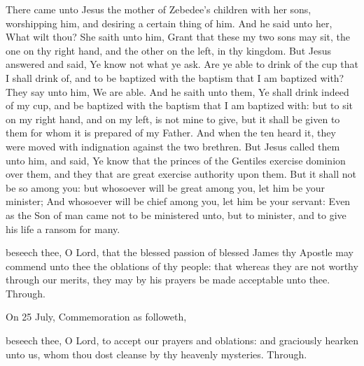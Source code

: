 

 There came unto Jesus the mother of Zebedee's children with her sons, worshipping him, and desiring a certain thing of him. And he said unto her, What wilt thou? She saith unto him, Grant that these my two sons may sit, the one on thy right hand, and the other on the left, in thy kingdom. But Jesus answered and said, Ye know not what ye ask. Are ye able to drink of the cup that I shall drink of, and to be baptized with the baptism that I am baptized with? They say unto him, We are able. And he saith unto them, Ye shall drink indeed of my cup, and be baptized with the baptism that I am baptized with: but to sit on my right hand, and on my left, is not mine to give, but it shall be given to them for whom it is prepared of my Father. And when the ten heard it, they were moved with indignation against the two brethren. But Jesus called them unto him, and said, Ye know that the princes of the Gentiles exercise dominion over them, and they that are great exercise authority upon them. But it shall not be so among you: but whosoever will be great among you, let him be your minister; And whosoever will be chief among you, let him be your servant: Even as the Son of man came not to be ministered unto, but to minister, and to give his life a ransom for many.


\clearpage
\secret
{} beseech thee, O Lord, that the blessed passion of blessed James thy Apostle may commend unto thee the oblations of thy people: that whereas they are not worthy through our merits, they may by his prayers be made acceptable unto thee. Through.
\begin{rubric}
	 On 25 July, Commemoration  as followeth,
\end{rubric}
 beseech thee, O Lord, to accept our prayers and oblations: and graciously hearken unto us, whom thou dost cleanse by thy heavenly mysteries. Through.

